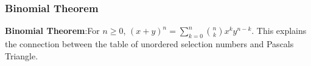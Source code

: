 \documentclass[xcolor=table]{beamer}
\begin{document}
\frame
{
  \frametitle{Binomial Theorem}

{\bf Binomial Theorem}:For $n\ge 0$, $(x+y)^n= \sum^{n}_{k=0}\binom{n}{k}x^ky^{n-k}$.\vfill
This explains the connection between the table of unordered selection numbers and Pascals Triangle.
}

\end{document}
